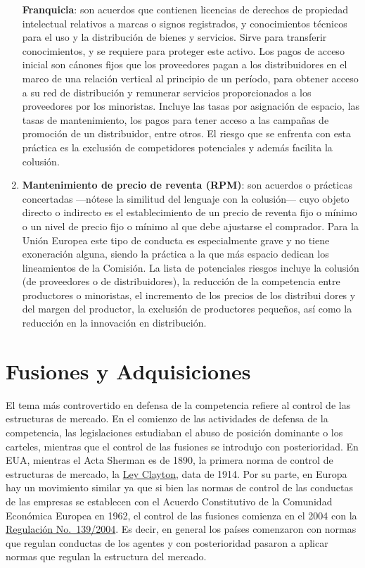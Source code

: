 \documentclass[
  12pt,
  spanish,
]{book}
\begin{document}
\begin{enumerate}
  \textbf{Franquicia}: son acuerdos que contienen licencias de derechos de propiedad intelectual relativos a marcas o signos registrados, y conocimientos técnicos para el uso y la distribución de bienes y servicios. Sirve para transferir conocimientos, y se requiere para proteger este activo. Los pagos de acceso inicial son cánones fijos que los proveedores pagan a los distribuidores en el marco de una relación vertical al principio de un período, para obtener acceso a su red de distribución y remunerar servicios proporcionados a los proveedores por los minoristas. Incluye las tasas por asignación de espacio, las tasas de mantenimiento, los pagos para tener acceso a las campañas de promoción de un distribuidor, entre otros. El riesgo que se enfrenta con esta práctica es la exclusión de competidores potenciales y además facilita la colusión.
\item
  \textbf{Mantenimiento de precio de reventa (RPM)}: son acuerdos o prácticas concertadas ---nótese la similitud del lenguaje con la colusión--- cuyo objeto directo o indirecto es el establecimiento de un precio de reventa fijo o mínimo o un nivel de precio fijo o mínimo al que debe ajustarse el comprador. Para la Unión Europea este tipo de conducta es especialmente grave y no tiene exoneración alguna, siendo la práctica a la que más espacio dedican los lineamientos de la Comisión. La lista de potenciales riesgos incluye la colusión (de proveedores o de distribuidores), la reducción de la competencia entre productores o minoristas, el incremento de los precios de los distribui dores y del margen del productor, la exclusión de productores pequeños, así como la reducción en la innovación en distribución.
\end{enumerate}

\hypertarget{fusiones-y-adquisiciones}{%
\section{Fusiones y Adquisiciones}\label{fusiones-y-adquisiciones}}

El tema más controvertido en defensa de la competencia refiere al control de las estructuras de mercado. En el comienzo de las actividades de defensa de la competencia, las legislaciones estudiaban el abuso de posición dominante o los carteles, mientras que el control de las fusiones se introdujo con posterioridad. En EUA, mientras el Acta Sherman es de 1890, la primera norma de control de estructuras de mercado, la \href{https://wps.prenhall.com/wps/media/objects/751/769950/Documents_Library/clayton.htm}{Ley Clayton}, data de 1914. Por su parte, en Europa hay un movimiento similar ya que si bien las normas de control de las conductas de las empresas se establecen con el Acuerdo Constitutivo de la Comunidad Económica Europea en 1962, el control de las fusiones comienza en el 2004 con la \href{https://eur-lex.europa.eu/legal-content/ES/TXT/PDF/?uri=CELEX:32004R0139\&from=ES}{Regulación No.~139/2004}. Es decir, en general los países comenzaron con normas que regulan conductas de los agentes y con posterioridad pasaron a aplicar normas que regulan la estructura del mercado.
\end{document}
